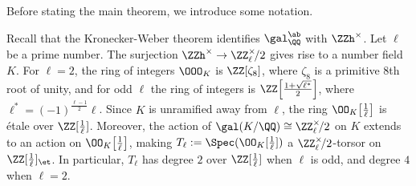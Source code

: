 Before stating the main theorem, we introduce some notation. 

Recall that the Kronecker-Weber theorem identifies $\gal^{\ab}_{\QQ}$ with $\ZZh^{\times}$. Let $\ell$ be a prime number. The surjection $\ZZh^{\times} \rightarrow \ZZ_{\ell}^{\times}\!/2$ gives rise to a number field $K$. For $\ell = 2$, the ring of integers $\OOO_{K}$ is $\ZZ[\zeta_8]$, where $\zeta_8$ is a primitive $8$th root of unity, and for odd $\ell$ the ring of integers is $\ZZ\!\left[\tfrac{1 + \sqrt{\ell^{\ast}}}{2}\right]$, where $\ell^{*} = (-1)^{\tfrac{\ell - 1}{2}} \ell$. Since $K$ is unramified away from $\ell$, the ring $\OO_{K}\!\left[ \tfrac{1}{\ell} \right]$ is \'etale over $\ZZ[\tfrac{1}{\ell}]$. Moreover, the action of $\gal(K/\QQ) \cong \ZZ_{\ell}^{\times}\!/2$ on $K$ extends to an action on $\OO_{K}\!\left[\tfrac{1}{\ell}\right]$, making $T_{\ell} := \Spec(\OO_{K}[\tfrac{1}{\ell}])$ a $\ZZ_{\ell}^{\times}\!/2$-torsor on $\ZZ[\tfrac{1}{\ell}]_{\et}$. In particular, $T_{\ell}$ has degree $2$ over $\ZZ[\tfrac{1}{\ell}]$ when $\ell$ is odd, and degree $4$ when $\ell = 2$. 

